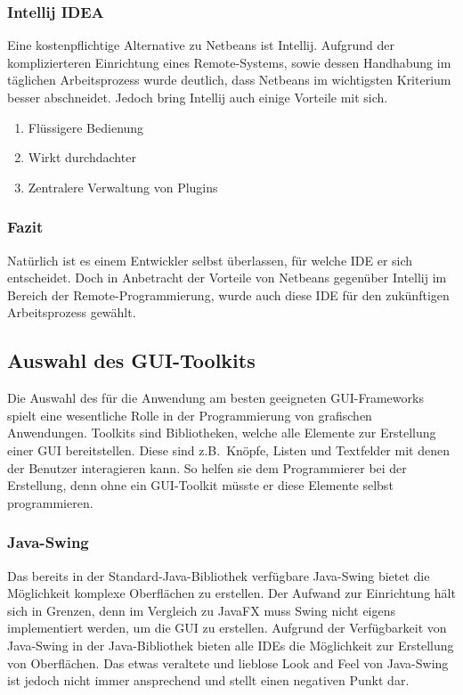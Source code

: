 \subsubsection{Intellij IDEA}
Eine kostenpflichtige Alternative zu Netbeans ist Intellij.
Aufgrund der komplizierteren Einrichtung eines Remote-Systems, sowie dessen Handhabung im täglichen Arbeitsprozess wurde deutlich, dass Netbeans im wichtigsten Kriterium besser abschneidet.
Jedoch bring Intellij auch einige Vorteile mit sich.
\begin{enumerate}
    \item Flüssigere Bedienung
    \item Wirkt durchdachter
    \item Zentralere Verwaltung von Plugins
\end{enumerate}
\subsubsection{Fazit}
Natürlich ist es einem Entwickler selbst überlassen, für welche IDE er sich entscheidet.
Doch in Anbetracht der Vorteile von Netbeans gegenüber Intellij im Bereich der Remote-Programmierung, wurde auch diese IDE für den zukünftigen Arbeitsprozess gewählt.
\subsection{Auswahl des \acs{GUI}-Toolkits}\label{subsec:auswahl-des-gui-frameworks}
Die Auswahl des für die Anwendung am besten geeigneten GUI-Frameworks spielt eine wesentliche Rolle in der Programmierung von grafischen Anwendungen.
Toolkits sind Bibliotheken, welche alle Elemente zur Erstellung einer GUI bereitstellen.
Diese sind z.B.\ Knöpfe, Listen und Textfelder mit denen der Benutzer interagieren kann.
So helfen sie dem Programmierer bei der Erstellung, denn ohne ein GUI-Toolkit müsste er diese Elemente selbst programmieren.
\subsubsection{Java-Swing}
Das bereits in der Standard-Java-Bibliothek verfügbare Java-Swing bietet die Möglichkeit komplexe Oberflächen zu erstellen.
Der Aufwand zur Einrichtung hält sich in Grenzen, denn im Vergleich zu JavaFX muss Swing nicht eigens implementiert werden, um die GUI zu erstellen.
Aufgrund der Verfügbarkeit von Java-Swing in der Java-Bibliothek bieten alle IDEs die Möglichkeit zur Erstellung von Oberflächen.
Das etwas veraltete und lieblose Look and Feel von Java-Swing ist jedoch nicht immer ansprechend und stellt einen negativen Punkt dar.
